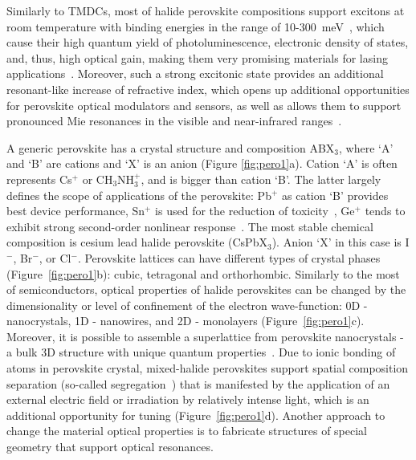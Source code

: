 \documentclass[journal=chreay,manuscript=review]{achemso}
\begin{document}
Similarly to TMDCs, most of halide perovskite compositions support excitons at room temperature with binding energies in the range of 10-300~meV~\cite{d2014excitons,mauck2019excitons,baranowski2020excitons}, which cause their high quantum yield of photoluminescence, electronic density of states, and, thus, high optical gain, making them very promising materials for lasing applications~\cite{zhu2015lead, sutherland2016perovskite,zhang2017advances,qin2020stable,lei2021metal}. Moreover, such a strong excitonic state provides an additional resonant-like increase of refractive index, which  opens up additional opportunities for perovskite optical modulators and sensors, as well as allows them to support pronounced Mie resonances in the visible and near-infrared ranges~\cite{tiguntseva2018light,tiguntseva2020room}. 

A generic perovskite has a crystal structure and composition ABX$_3$, where `A' and `B' are cations and `X' is an anion (Figure \ref{fig:pero1}a). Cation `A' is often represents Cs$^+$ or CH$_3$NH$_3^+$, and is bigger than cation `B'. The latter largely defines the scope of applications of the perovskite: Pb$^+$ as cation `B' provides best device performance, Sn$^+$ is used for the reduction of  toxicity~\cite{xiao2019lead}, Ge$^+$ tends to exhibit strong second-order nonlinear response~\cite{stoumpos2015hybrid}. The most stable chemical composition is cesium lead halide perovskite (CsPbX$_3$). Anion `X' in this case is I$^-$, Br$^-$, or Cl$^-$. Perovskite lattices can have different types of crystal phases (Figure~\ref{fig:pero1}b): cubic, tetragonal and orthorhombic. Similarly to the most of semiconductors, optical properties of halide perovskites can be changed by the dimensionality or level of confinement of the electron wave-function: 0D - nanocrystals, 1D - nanowires, and 2D - monolayers (Figure~\ref{fig:pero1}c). Moreover, it is possible to assemble a superlattice from perovskite nanocrystals - a bulk 3D structure with unique quantum properties~\cite{raino2018superfluorescence}.
Due to ionic bonding of atoms in perovskite crystal, mixed-halide perovskites support spatial composition separation (so-called segregation~\cite{hoke2015reversible}) that is manifested by the application of an external electric field or irradiation by relatively intense light, which is an additional opportunity for tuning (Figure~\ref{fig:pero1}d).
Another approach to change the material optical properties is to fabricate structures of special geometry that support optical resonances.
\end{document}
